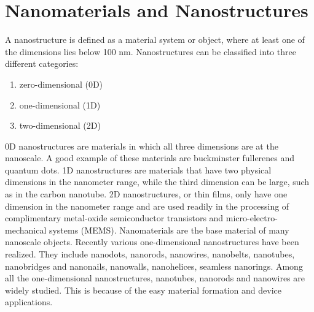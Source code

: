 \section {Nanomaterials and Nanostructures}
A nanostructure is defined as a material system or object, where
at least one of the dimensions lies below 100 nm. Nanostructures
can be classified into three different categories:
\begin{enumerate}
\item zero-dimensional (0D)
\item one-dimensional (1D)
\item two-dimensional (2D)
\end{enumerate}
0D nanostructures are materials in which all three dimensions are at the nanoscale. A good example of these materials are buckminster fullerenes  and quantum dots. 1D nanostructures are materials that have two physical dimensions in the nanometer range, while the third dimension can be large, such as in the carbon nanotube. 2D nanostructures, or thin films, only have one dimension in the nanometer range and are used readily in the processing of complimentary metal-oxide semiconductor transistors and micro-electro-mechanical systems (MEMS). Nanomaterials are the base material of many nanoscale objects. Recently various one-dimensional nanostructures have been realized. They include nanodots, nanorods, nanowires, nanobelts, nanotubes, nanobridges and nanonails, nanowalls, nanohelices, seamless nanorings. Among all the one-dimensional nanostructures, nanotubes, nanorods and nanowires are widely studied. This is because of the easy material formation and device applications.

